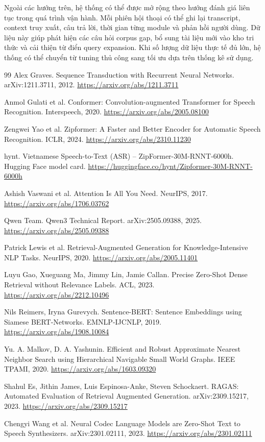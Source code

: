 \documentclass[a4paper,13pt,oneside]{report}
\begin{document}
Ngoài các hướng trên, hệ thống có thể được mở rộng theo hướng đánh giá liên tục trong quá trình vận hành. Mỗi phiên hội thoại có thể ghi lại transcript, context truy xuất, câu trả lời, thời gian từng module và phản hồi người dùng. Dữ liệu này giúp phát hiện các câu hỏi corpus gap, bổ sung tài liệu mới vào kho tri thức và cải thiện từ điển query expansion. Khi số lượng dữ liệu thực tế đủ lớn, hệ thống có thể chuyển từ tuning thủ công sang tối ưu dựa trên thống kê sử dụng.

\begin{thebibliography}{99}
    Alex Graves. Sequence Transduction with Recurrent Neural Networks. arXiv:1211.3711, 2012. \url{https://arxiv.org/abs/1211.3711}

    Anmol Gulati et al. Conformer: Convolution-augmented Transformer for Speech Recognition. Interspeech, 2020. \url{https://arxiv.org/abs/2005.08100}

    Zengwei Yao et al. Zipformer: A Faster and Better Encoder for Automatic Speech Recognition. ICLR, 2024. \url{https://arxiv.org/abs/2310.11230}

    hynt. Vietnamese Speech-to-Text (ASR) -- ZipFormer-30M-RNNT-6000h. Hugging Face model card. \url{https://huggingface.co/hynt/Zipformer-30M-RNNT-6000h}

    Ashish Vaswani et al. Attention Is All You Need. NeurIPS, 2017. \url{https://arxiv.org/abs/1706.03762}

    Qwen Team. Qwen3 Technical Report. arXiv:2505.09388, 2025. \url{https://arxiv.org/abs/2505.09388}

    Patrick Lewis et al. Retrieval-Augmented Generation for Knowledge-Intensive NLP Tasks. NeurIPS, 2020. \url{https://arxiv.org/abs/2005.11401}

    Luyu Gao, Xueguang Ma, Jimmy Lin, Jamie Callan. Precise Zero-Shot Dense Retrieval without Relevance Labels. ACL, 2023. \url{https://arxiv.org/abs/2212.10496}

    Nils Reimers, Iryna Gurevych. Sentence-BERT: Sentence Embeddings using Siamese BERT-Networks. EMNLP-IJCNLP, 2019. \url{https://arxiv.org/abs/1908.10084}

    Yu. A. Malkov, D. A. Yashunin. Efficient and Robust Approximate Nearest Neighbor Search using Hierarchical Navigable Small World Graphs. IEEE TPAMI, 2020. \url{https://arxiv.org/abs/1603.09320}

    Shahul Es, Jithin James, Luis Espinosa-Anke, Steven Schockaert. RAGAS: Automated Evaluation of Retrieval Augmented Generation. arXiv:2309.15217, 2023. \url{https://arxiv.org/abs/2309.15217}

    Chengyi Wang et al. Neural Codec Language Models are Zero-Shot Text to Speech Synthesizers. arXiv:2301.02111, 2023. \url{https://arxiv.org/abs/2301.02111}

\end{thebibliography}
\end{document}
